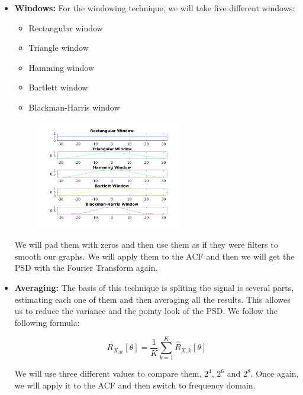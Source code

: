 \documentclass[a4paper,11pt]{article}
\begin{document}
\begin{itemize}
  \item \textbf{Windows:}
  For the windowing technique, we will take five different windows:

  \begin{itemize}
    \item Rectangular window
    \item Triangle window
    \item Hamming window
    \item Bartlett window
    \item Blackman-Harris window
  \end{itemize}

  \begin{figure}[!hp]
      \begin{center}
        \includegraphics[width=0.6\textwidth]{images/study2/windows.png}
      \end{center}
  \end{figure}

  We will pad them with zeros and then use them as if they were filters to
  smooth our graphs. We will apply them to the ACF and then we will get the
  PSD with the Fourier Transform again.

  \item \textbf{Averaging:}
  The basis of this technique is spliting the signal is several parts,
  estimating each one of them and then averaging all the results. This allowes
  us to reduce the variance and the pointy look of the PSD. We follow the
  following formula:

  \begin{equation}\label{eq:Averaging}
    R_{X_{Av}}[\theta] = \displaystyle\frac{1}{K} \displaystyle\sum_{k=1}^{K} \hat{R}_{X,k}[\theta]
  \end{equation}

  We will use three different values to compare them, $2^4$, $2^6$ and $2^8$.
  Once again, we will apply it to the ACF and then switch to frequency domain.

\end{itemize}
\end{document}
